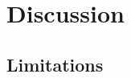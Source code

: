 \documentclass[../Dissertation]{subfiles}
\begin{document}
\section{Discussion}\label{discussion_3}
    \lipsum[5-10]
    
\subsection{Limitations}\label{chp3_limitations}
    \lipsum[11-12]
\end{document}
